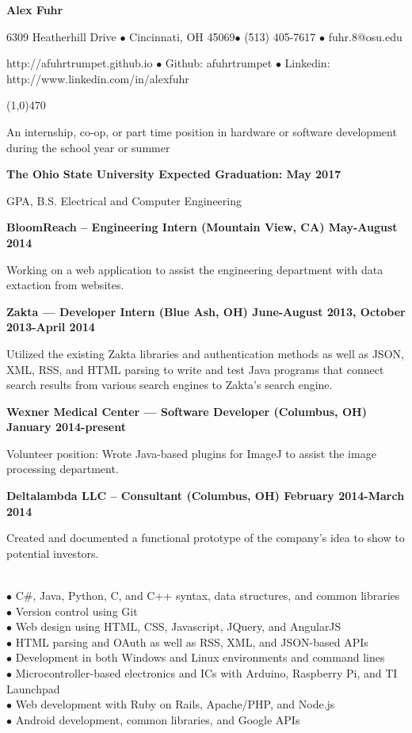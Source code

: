 \documentclass[10pt]{article}
\begin{document}
\centerline{{\LARGE \bf Alex Fuhr}}

\centerline{6309 Heatherhill Drive $\bullet$ Cincinnati, OH 45069$\bullet$ (513) 405-7617 $\bullet$ fuhr.8@osu.edu}
\centerline{http://afuhrtrumpet.github.io $\bullet$ Github: afuhrtrumpet $\bullet$ Linkedin: http://www.linkedin.com/in/alexfuhr}
\noindent
\line(1,0){470}\\

\smallskip

\noindent
An internship, co-op, or part time position in hardware or software development during the school year or summer
\medskip

\smallskip

\centerline{{\large \bf The Ohio State University \hfill Expected Graduation: May 2017}}
 GPA, B.S. Electrical and Computer Engineering
\medskip

\smallskip

\centerline{{\large \bf BloomReach -- Engineering Intern (Mountain View, CA) \hfill May-August 2014}}
\noindent
Working on a web application to assist the engineering department with data extaction from websites.

\centerline{{\large \bf Zakta --- Developer Intern (Blue Ash, OH) \hfill June-August 2013, October 2013-April 2014}}
\noindent
Utilized the existing Zakta libraries and authentication methods as well as JSON, XML, RSS, and HTML parsing to write and test Java programs that connect search results from various search engines to Zakta's search engine.

\centerline{{\large \bf Wexner Medical Center --- Software Developer (Columbus, OH) \hfill January 2014-present}}
\noindent
Volunteer position: Wrote Java-based plugins for ImageJ to assist the image processing department.

\centerline{{\large \bf Deltalambda LLC -- Consultant (Columbus, OH) \hfill February 2014-March 2014}}
\noindent
Created and documented a functional prototype of the company's idea to show to potential investors.
\medskip

\\
\smallskip
$\bullet$ C\#, Java, Python, C, and C++ syntax, data structures, and common libraries\\
$\bullet$ Version control using Git\\
$\bullet$ Web design using HTML, CSS, Javascript, JQuery, and AngularJS\\
$\bullet$ HTML parsing and OAuth as well as RSS, XML, and JSON-based APIs\\
$\bullet$ Development in both Windows and Linux environments and command lines\\
$\bullet$ Microcontroller-based electronics and ICs with Arduino, Raspberry Pi, and TI Launchpad\\
$\bullet$ Web development with Ruby on Rails, Apache/PHP, and Node.js\\
$\bullet$ Android development, common libraries, and Google APIs
\medskip
\end{document}
